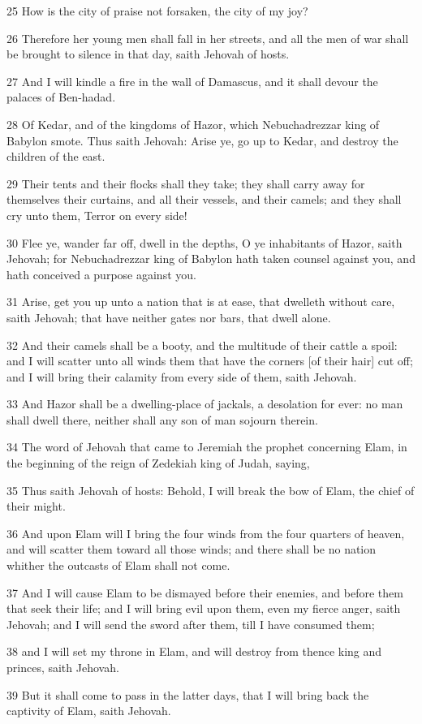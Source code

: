 \par 25 How is the city of praise not forsaken, the city of my joy?
\par 26 Therefore her young men shall fall in her streets, and all the men of war shall be brought to silence in that day, saith Jehovah of hosts.
\par 27 And I will kindle a fire in the wall of Damascus, and it shall devour the palaces of Ben-hadad.
\par 28 Of Kedar, and of the kingdoms of Hazor, which Nebuchadrezzar king of Babylon smote. Thus saith Jehovah: Arise ye, go up to Kedar, and destroy the children of the east.
\par 29 Their tents and their flocks shall they take; they shall carry away for themselves their curtains, and all their vessels, and their camels; and they shall cry unto them, Terror on every side!
\par 30 Flee ye, wander far off, dwell in the depths, O ye inhabitants of Hazor, saith Jehovah; for Nebuchadrezzar king of Babylon hath taken counsel against you, and hath conceived a purpose against you.
\par 31 Arise, get you up unto a nation that is at ease, that dwelleth without care, saith Jehovah; that have neither gates nor bars, that dwell alone.
\par 32 And their camels shall be a booty, and the multitude of their cattle a spoil: and I will scatter unto all winds them that have the corners [of their hair] cut off; and I will bring their calamity from every side of them, saith Jehovah.
\par 33 And Hazor shall be a dwelling-place of jackals, a desolation for ever: no man shall dwell there, neither shall any son of man sojourn therein.
\par 34 The word of Jehovah that came to Jeremiah the prophet concerning Elam, in the beginning of the reign of Zedekiah king of Judah, saying,
\par 35 Thus saith Jehovah of hosts: Behold, I will break the bow of Elam, the chief of their might.
\par 36 And upon Elam will I bring the four winds from the four quarters of heaven, and will scatter them toward all those winds; and there shall be no nation whither the outcasts of Elam shall not come.
\par 37 And I will cause Elam to be dismayed before their enemies, and before them that seek their life; and I will bring evil upon them, even my fierce anger, saith Jehovah; and I will send the sword after them, till I have consumed them;
\par 38 and I will set my throne in Elam, and will destroy from thence king and princes, saith Jehovah.
\par 39 But it shall come to pass in the latter days, that I will bring back the captivity of Elam, saith Jehovah.

